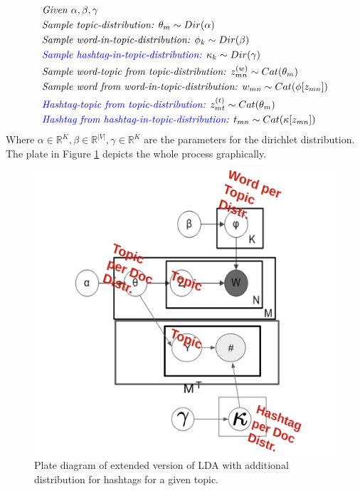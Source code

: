 \documentclass[10pt,conference,compsocconf]{IEEEtran}
\newcommand\R{\mathbb{R}}
\begin{document}
\small
\begin{align*}
&\textit{Given } \alpha, \beta, \gamma \\
&\textit{Sample topic-distribution: } \theta_m \sim Dir(\alpha)\\
&\textit{Sample word-in-topic-distribution: } \phi_k \sim Dir(\beta) \\
& \textcolor{blue}{\textit{Sample hashtag-in-topic-distribution: }} \kappa_k \sim Dir(\gamma) \\
&\textit{Sample word-topic from topic-distribution: } z^{(w)}_{mn} \sim Cat(\theta_m) \\
&\textit{Sample word from word-in-topic-distribution: } w_{mn} \sim Cat(\phi[z_{mn}])\\
&\textcolor{blue}{\textit{Hashtag-topic from topic-distribution: }} z^{(t)}_{mt} \sim Cat(\theta_m) \\
&\textcolor{blue}{\textit{Hashtag from hashtag-in-topic-distribution: }} t_{mn} \sim Cat(\kappa[z_{mn}])\\
\end{align*}
\normalsize
Where $\alpha \in \R^K, \beta \in \R^{|V|}, \gamma \in \R^K$ are the parameters for the dirichlet distribution. The plate in Figure \ref{fig:ldaplate2} depicts the whole process graphically.
\begin{figure}
	\centering
	\includegraphics[width=0.7\linewidth]{images/extended_lda}
	\caption{Plate diagram of extended version of LDA with additional distribution for hashtags for a given topic. }
	\label{fig:ldaplate2}
\end{figure}
\end{document}
